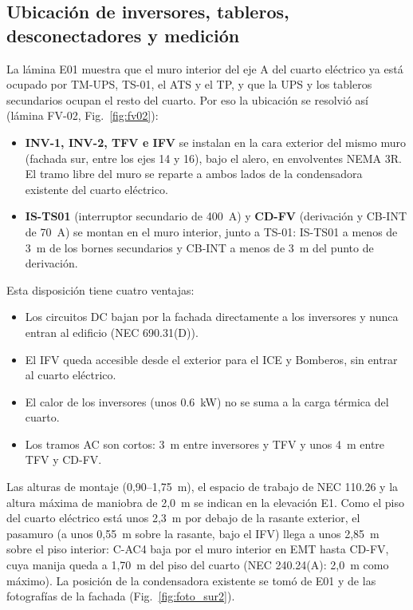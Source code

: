 \documentclass[12pt]{article}
\begin{document}
\subsection{Ubicación de inversores, tableros, desconectadores y medición}
La lámina E01 muestra que el muro interior del eje A del cuarto eléctrico ya está ocupado por TM-UPS, TS-01, el ATS y el TP, y que la UPS y los tableros secundarios ocupan el resto del cuarto. Por eso la ubicación se resolvió así (lámina FV-02, Fig.~\ref{fig:fv02}):
\begin{itemize}
\item \textbf{INV-1, INV-2, TFV e IFV} se instalan en la cara exterior del mismo muro (fachada sur, entre los ejes 14 y 16), bajo el alero, en envolventes NEMA 3R. El tramo libre del muro se reparte a ambos lados de la condensadora existente del cuarto eléctrico.
\item \textbf{IS-TS01} (interruptor secundario de 400~A) y \textbf{CD-FV} (derivación y CB-INT de 70~A) se montan en el muro interior, junto a TS-01: IS-TS01 a menos de 3~m de los bornes secundarios y CB-INT a menos de 3~m del punto de derivación.
\end{itemize}

Esta disposición tiene cuatro ventajas:
\begin{itemize}
\item Los circuitos DC bajan por la fachada directamente a los inversores y nunca entran al edificio (NEC 690.31(D)).
\item El IFV queda accesible desde el exterior para el ICE y Bomberos, sin entrar al cuarto eléctrico.
\item El calor de los inversores (unos \SI{0.6}{\kilo\watt}) no se suma a la carga térmica del cuarto.
\item Los tramos AC son cortos: 3~m entre inversores y TFV y unos 4~m entre TFV y CD-FV.
\end{itemize}

Las alturas de montaje (0,90--1,75~m), el espacio de trabajo de NEC 110.26 y la altura máxima de maniobra de 2,0~m se indican en la elevación E1. Como el piso del cuarto eléctrico está unos 2,3~m por debajo de la rasante exterior, el pasamuro (a unos 0,55~m sobre la rasante, bajo el IFV) llega a unos 2,85~m sobre el piso interior: C-AC4 baja por el muro interior en EMT hasta CD-FV, cuya manija queda a 1,70~m del piso del cuarto (NEC 240.24(A): 2,0~m como máximo). La posición de la condensadora existente se tomó de E01 y de las fotografías de la fachada (Fig.~\ref{fig:foto_sur2}).
\end{document}
